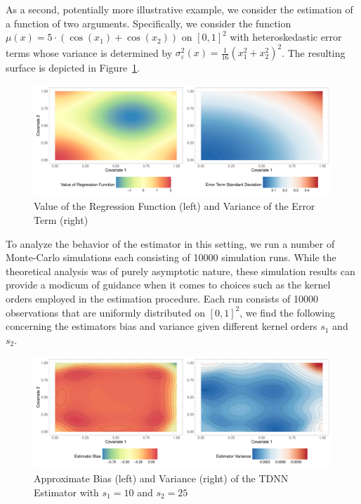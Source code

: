 \newpage
As a second, potentially more illustrative example, we consider the estimation of a function of two arguments.
Specifically, we consider the function $\mu(x) = 5 \cdot \left(\cos(x_1) + \cos(x_2)\right)$ on ${[0,1]}^2$ with heteroskedastic error terms whose variance is determined by $\sigma_{\varepsilon}^2(x) = \frac{1}{16}{\left(x_1^2 + x_2^2\right)}^2$.
The resulting surface is depicted in Figure~\ref{fig:reg_surface}.
\begin{figure}[H]
	\centering
	\includegraphics[width = \textwidth]{../Graphics/Reg_Exmp1.pdf}
	\caption{Value of the Regression Function (left) and Variance of the Error Term (right)}
	\label{fig:reg_surface}
\end{figure}
To analyze the behavior of the estimator in this setting, we run a number of Monte-Carlo simulations each consisting of 10000 simulation runs.
While the theoretical analysis was of purely asymptotic nature, these simulation results can provide a modicum of guidance when it comes to choices such as the kernel orders employed in the estimation procedure.
Each run consists of 10000 observations that are uniformly distributed on ${[0,1]}^2$, we find the following concerning the estimators bias and variance given different kernel orders $s_1$ and $s_2$.
\begin{figure}[H]
	\centering
	\includegraphics[width = \textwidth]{../Code/Simulations/Graphics/Reg_Exp1/TDNN/Plot_TDNN_n10000s_10_25.RDS.pdf}
	\caption{Approximate Bias (left) and Variance (right) of the TDNN Estimator with $s_1 = 10$ and $s_2 = 25$}
	\label{fig:est_bias_var_2}
\end{figure}
